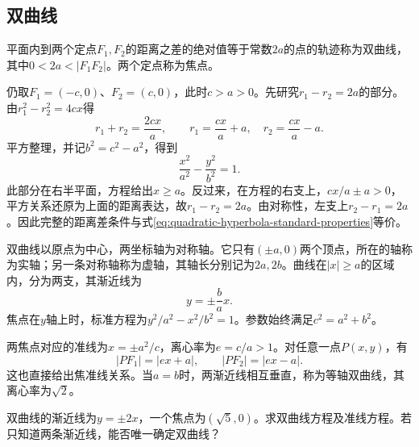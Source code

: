 \subsection{双曲线}
\label{subsec:quadratic-hyperbola}

\begin{definition}
平面内到两个定点\(F_1,F_2\)的距离之差的绝对值等于常数\(2a\)的点的轨迹称为{\heiti{}双曲线}，其中\(0<2a<|F_1F_2|\)。两个定点称为焦点。
\end{definition}

仍取\(F_1=(-c,0)\)、\(F_2=(c,0)\)，此时\(c>a>0\)。先研究\(r_1-r_2=2a\)的部分。由\(r_1^2-r_2^2=4cx\)得
\begin{equation*}
    r_1+r_2=\frac{2cx}{a} ,\qquad
    r_1=\frac{cx}{a}+a ,\quad r_2=\frac{cx}{a}-a .
\end{equation*}
平方整理，并记\(b^2=c^2-a^2\)，得到
\begin{equation}\label{eq:quadratic-hyperbola-standard-properties}
    \frac{x^2}{a^2}-\frac{y^2}{b^2}=1 .
\end{equation}
此部分在右半平面，方程给出\(x\ge a\)。反过来，在方程的右支上，\(cx/a\pm a>0\)，平方关系还原为上面的距离表达，故\(r_1-r_2=2a\)。由对称性，左支上\(r_2-r_1=2a\)。因此完整的距离差条件与式\eqref{eq:quadratic-hyperbola-standard-properties}等价。

双曲线以原点为中心，两坐标轴为对称轴。它只有\((\pm a,0)\)两个顶点，所在的轴称为{\heiti{}实轴}；另一条对称轴称为{\heiti{}虚轴}，其轴长分别记为\(2a,2b\)。曲线在\(|x|\ge a\)的区域内，分为两支，其渐近线为
\begin{equation}\label{eq:quadratic-hyperbola-asymptotes-standard}
    y=\pm\frac ba x .
\end{equation}
焦点在\(y\)轴上时，标准方程为\(y^2/a^2-x^2/b^2=1\)。参数始终满足\(c^2=a^2+b^2\)。

两焦点对应的准线为\(x=\pm a^2/c\)，离心率为\(e=c/a>1\)。对任意一点\(P(x,y)\)，有
\begin{equation}\label{eq:quadratic-hyperbola-focal-radius}
    |PF_1|=|ex+a| ,\qquad |PF_2|=|ex-a| .
\end{equation}
这也直接给出焦准线关系。当\(a=b\)时，两渐近线相互垂直，称为{\heiti{}等轴双曲线}，其离心率为\(\sqrt2\)。

\begin{samepage}
\begin{example}
双曲线的渐近线为\(y=\pm2x\)，一个焦点为\((\sqrt5,0)\)。求双曲线方程及准线方程。若只知道两条渐近线，能否唯一确定双曲线？
\end{example}
\end{samepage}

